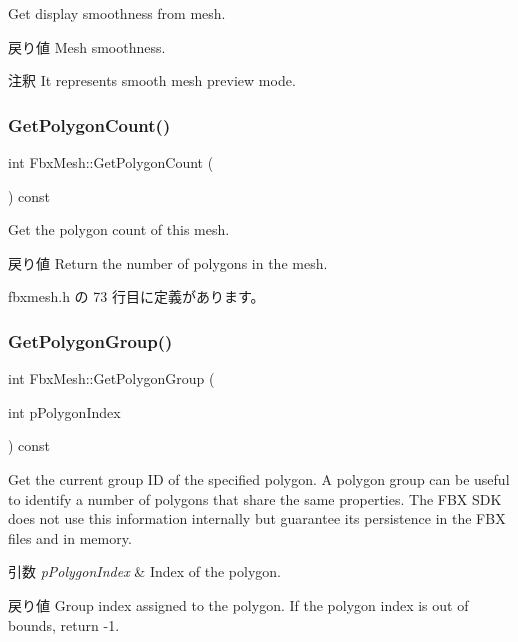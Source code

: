 Get display smoothness from mesh. \begin{DoxyReturn}{戻り値}
Mesh smoothness. 
\end{DoxyReturn}
\begin{DoxyRemark}{注釈}
It represents smooth mesh preview mode. 
\end{DoxyRemark}
\mbox{\label{class_fbx_mesh_a0f443f6d64284e6b60bdd52fb1f53ea7}} 
\subsubsection{\texorpdfstring{Get\+Polygon\+Count()}{GetPolygonCount()}}
{\footnotesize\ttfamily int Fbx\+Mesh\+::\+Get\+Polygon\+Count (\begin{DoxyParamCaption}{ }\end{DoxyParamCaption}) const\hspace{0.3cm}{\ttfamily [inline]}}

Get the polygon count of this mesh. \begin{DoxyReturn}{戻り値}
Return the number of polygons in the mesh. 
\end{DoxyReturn}


 fbxmesh.\+h の 73 行目に定義があります。

\mbox{\label{class_fbx_mesh_aca17b9c024aa056115bdb173daf25e8c}} 
\subsubsection{\texorpdfstring{Get\+Polygon\+Group()}{GetPolygonGroup()}}
{\footnotesize\ttfamily int Fbx\+Mesh\+::\+Get\+Polygon\+Group (\begin{DoxyParamCaption}\item[{int}]{p\+Polygon\+Index }\end{DoxyParamCaption}) const}

Get the current group ID of the specified polygon. A polygon group can be useful to identify a number of polygons that share the same properties. The F\+BX S\+DK does not use this information internally but guarantee its persistence in the F\+BX files and in memory. 
\begin{DoxyParams}{引数}
{\em p\+Polygon\+Index} & Index of the polygon. \\
\hline
\end{DoxyParams}
\begin{DoxyReturn}{戻り値}
Group index assigned to the polygon. If the polygon index is out of bounds, return -\/1. 
\end{DoxyReturn}
\mbox{\label{class_fbx_mesh_a775d0e10dc67bbcb9f7368d828588e55}} 
